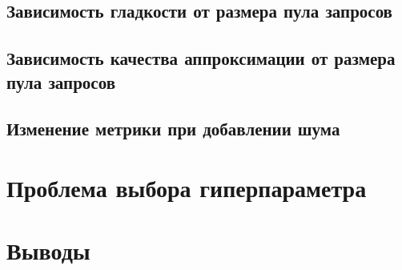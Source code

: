 \documentclass[12pt,a4paper]{amsart}
\theoremstyle{definition}
\theoremstyle{definition}
\begin{document}
\subsection{Зависимость гладкости от размера пула запросов}
\pagebreak


\subsection{Зависимость качества аппроксимации от размера пула запросов}
\pagebreak


\subsection{Изменение метрики при добавлении шума}
\pagebreak


\newpage
\section{Проблема выбора гиперпараметра}


\newpage
\section{Выводы}


\newpage

\begin{thebibliography}{9}


\end{thebibliography}


\vspace{0.7cm}
\end{document}
